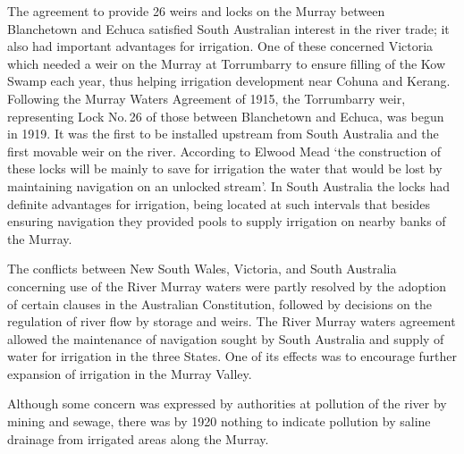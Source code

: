 The agreement to provide 26 weirs and locks on the Murray between
Blanche\-town and Echuca satisfied South Australian interest in the
river trade; it also had important advantages for irrigation.  One of
these concerned Victoria which needed a weir on the Murray at
Torrumbarry to ensure filling of the Kow Swamp each year, thus helping
irrigation development near Cohuna and Kerang. Following the Murray
Waters Agreement of 1915, the Torrumbarry weir, representing Lock
No.\,26 of those between Blanchetown and Echuca, was begun in 1919. It
was the first to be installed upstream from South Australia and the
first movable weir on the river.  According to Elwood Mead `the
construction of these locks will be mainly to save for irrigation the
water that would be lost by maintaining navigation on an unlocked
stream'.  In South Australia the locks had definite advantages for
irrigation, being located at such intervals that besides ensuring
navigation they provided pools to supply irrigation on nearby banks of
the Murray.

\closure
The conflicts between New South Wales, Victoria, and South Australia
concerning use of the River Murray waters were partly resolved by the
adoption of certain clauses in the Australian Constitution, followed
by decisions on the regulation of river flow by storage and weirs.
The River Murray waters agreement allowed the maintenance of
navigation sought by South Australia and supply of water for
irrigation in the three States.  One of its effects was to encourage
further expansion of irrigation in the Murray Valley.

Although some concern was expressed by authorities at pollution of the
river by mining and sewage, there was by 1920 nothing to indicate
pollution by saline drainage from irrigated areas along the Murray.

